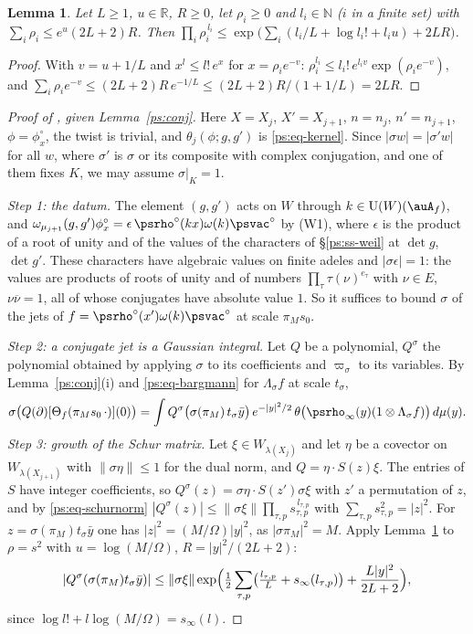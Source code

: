 \documentclass[10pt]{amsart}
\newtheorem{lemma}[theorem]{Lemma}
\theoremstyle{definition}
\theoremstyle{remark}
\newcommand{\R}{\mathbb R}
\newcommand{\N}{\mathbb N}
\providecommand{\auU}{\mathrm U}
\providecommand{\aubar}[1]{\overline{#1}}
\providecommand{\ausinf}{s_\infty}
\begin{document}
\begin{lemma}\label{ps:monomial}
Let $L\ge1$, $u\in\R$, $R\ge0$, let $\rho_i\ge0$ and $l_i\in\N$ ($i$ in a finite set) with
$\sum_i\rho_i\le e^u(2L+2)R$. Then $\prod_i\rho_i^{\,l_i}\le\exp\bigl(\sum_i(l_i/L+\log l_i!+l_iu)
+2LR\bigr)$.
\end{lemma}
\begin{proof}
With $v=u+1/L$ and $x^l\le l!\,e^x$ for $x=\rho_ie^{-v}$: $\rho_i^{l_i}\le l_i!\,e^{l_iv}\exp
(\rho_ie^{-v})$, and $\sum_i\rho_ie^{-v}\le(2L+2)R\,e^{-1/L}\le(2L+2)R/(1+1/L)=2LR$.
\end{proof}

\begin{proof}[Proof of {\cite[Proposition~14.23]{P46}}, given Lemma~\ref{ps:conj}]
Here $X=X_j$, $X'=X_{j+1}$, $n=n_j$, $n'=n_{j+1}$, $\phi=\phi^\circ_x$, the twist is trivial, and
$\theta_j(\phi;g,g')$ is \eqref{ps:eq-kernel}. Since $|\sigma w|=|\sigma'w|$ for all $w$, where
$\sigma'$ is $\sigma$ or its composite with complex conjugation, and one of them fixes $K$, we may
assume $\sigma|_K=1$.

\emph{Step 1: the datum.} The element $(g,g')$ acts on $W$ through $k\in\auU(W)(\auA_f)$, and
$\omega_{\mu_{j+1}}(g,g')\phi^\circ_x=\epsilon\,\psrho^\circ(kx)\omega(k)\psvac^\circ$ by (W1), where
$\epsilon$ is the product of a root of unity and of the values of the characters of
\S\ref{ps:ss-weil} at $\det g$, $\det g'$. These characters have algebraic values on finite adeles
and $|\sigma\epsilon|=1$: the values are products of roots of unity and of numbers
$\prod_\tau\tau(\nu)^{e_\tau}$ with $\nu\in E$, $\nu\aubar\nu=1$, all of whose conjugates have
absolute value $1$. So it suffices to bound $\sigma$ of the jets of $f=\psrho^\circ(x')\omega(k)
\psvac^\circ$ at scale $\pi_Ms_0$.

\emph{Step 2: a conjugate jet is a Gaussian integral.} Let $Q$ be a polynomial, $Q^\sigma$ the
polynomial obtained by applying $\sigma$ to its coefficients and $\varpi_\sigma$ to its variables.
By Lemma~\ref{ps:conj}(i) and \eqref{ps:eq-bargmann} for $\Lambda_\sigma f$ at scale $t_\sigma$,
\[
\sigma\bigl(Q(\partial)[\Theta_f(\pi_Ms_0\,\cdot)](0)\bigr)=\int Q^\sigma\bigl(\sigma(\pi_M)\,t_\sigma
\bar y\bigr)\,e^{-|y|^2/2}\,\theta\bigl(\psrho_\infty(y)(1\otimes\Lambda_\sigma f)\bigr)\,d\mu(y).
\]
\emph{Step 3: growth of the Schur matrix.} Let $\xi\in W_{\lambda(X_j)}$ and let $\eta$ be a
covector on $W_{\lambda(X_{j+1})}$ with $\|\sigma\eta\|\le1$ for the dual norm, and $Q=\eta\cdot
S(z)\xi$. The entries of $S$ have integer coefficients, so $Q^\sigma(z)=\sigma\eta\cdot S(z')
\sigma\xi$ with $z'$ a permutation of $z$, and by \eqref{ps:eq-schurnorm} $|Q^\sigma(z)|\le
\|\sigma\xi\|\prod_{\tau,p}s_{\tau,p}^{\,l_{\tau,p}}$ with $\sum_{\tau,p}s_{\tau,p}^2=|z|^2$. For
$z=\sigma(\pi_M)t_\sigma\bar y$ one has $|z|^2=(M/\Omega)|y|^2$, as $|\sigma\pi_M|^2=M$. Apply
Lemma~\ref{ps:monomial} to $\rho=s^2$ with $u=\log(M/\Omega)$, $R=|y|^2/(2L+2)$:
\[
|Q^\sigma(\sigma(\pi_M)t_\sigma\bar y)|\le\|\sigma\xi\|\exp\Bigl(\tfrac12\sum_{\tau,p}\bigl(
\tfrac{l_{\tau,p}}L+\ausinf(l_{\tau,p})\bigr)+\frac{L|y|^2}{2L+2}\Bigr),
\]
since $\log l!+l\log(M/\Omega)=\ausinf(l)$.


\end{proof}
\end{document}
